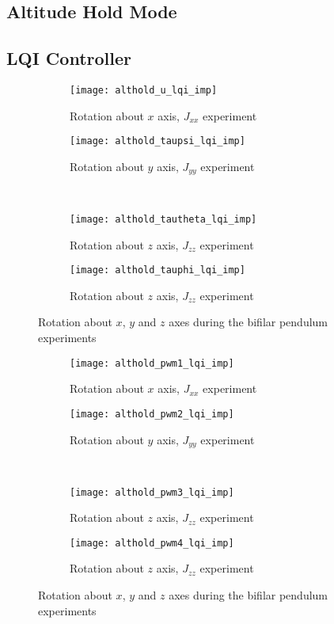 \begin{appendices}
\section*{Altitude Hold Mode}

\subsection*{LQI Controller}

\begin{figure}[H]
\begin{subfigure}{.5\linewidth}
\centering
\texttt{[image: althold\_u\_lqi\_imp]}
\caption{Rotation about $x$ axis, $J_{xx}$ experiment}
\label{fig:althold_u_lqi_imp}
\end{subfigure}%
\begin{subfigure}{.5\linewidth}
\centering
\texttt{[image: althold\_taupsi\_lqi\_imp]}
\caption{Rotation about $y$ axis, $J_{yy}$ experiment}
\label{fig:althold_taupsi_lqi_imp}
\end{subfigure}\\[1ex]
\begin{subfigure}{0.5\linewidth}
\centering
\texttt{[image: althold\_tautheta\_lqi\_imp]}
\caption{Rotation about $z$ axis, $J_{zz}$ experiment}
\label{fig:althold_tautheta_lqi_imp}
\end{subfigure}
\begin{subfigure}{0.5\linewidth}
\centering
\texttt{[image: althold\_tauphi\_lqi\_imp]}
\caption{Rotation about $z$ axis, $J_{zz}$ experiment}
\label{fig:althold_tauphi_lqi_imp}
\end{subfigure}
\caption{Rotation about $x$, $y$ and $z$ axes during the bifilar pendulum experiments}
\label{fig:althold_control_lqi}
\end{figure}

\begin{figure}[H]
\begin{subfigure}{.5\linewidth}
\centering
\texttt{[image: althold\_pwm1\_lqi\_imp]}
\caption{Rotation about $x$ axis, $J_{xx}$ experiment}
\label{fig:althold_pwm_lqi_imp}
\end{subfigure}%
\begin{subfigure}{.5\linewidth}
\centering
\texttt{[image: althold\_pwm2\_lqi\_imp]}
\caption{Rotation about $y$ axis, $J_{yy}$ experiment}
\label{fig:althold_pwm2_lqi_imp}
\end{subfigure}\\[1ex]
\begin{subfigure}{0.5\linewidth}
\centering
\texttt{[image: althold\_pwm3\_lqi\_imp]}
\caption{Rotation about $z$ axis, $J_{zz}$ experiment}
\label{fig:althold_pwm3_lqi_imp}
\end{subfigure}
\begin{subfigure}{0.5\linewidth}
\centering
\texttt{[image: althold\_pwm4\_lqi\_imp]}
\caption{Rotation about $z$ axis, $J_{zz}$ experiment}
\label{fig:althold_pwm4_lqi_imp}
\end{subfigure}
\caption{Rotation about $x$, $y$ and $z$ axes during the bifilar pendulum experiments}
\label{fig:althold_pwm_lqi}
\end{figure}


\end{appendices}
